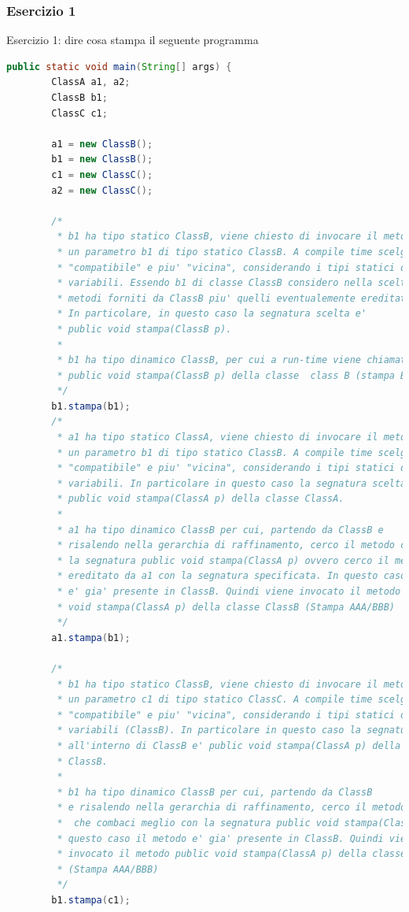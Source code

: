 \documentclass{article}
\begin{document}
\subsubsection{Esercizio 1}
\begin{framed}
Esercizio 1: dire cosa stampa il seguente programma 
\end{framed}
\begin{lstlisting}[language=Java,escapechar=|]
public static void main(String[] args) {
		ClassA a1, a2;
		ClassB b1;
		ClassC c1;

		a1 = new ClassB();
		b1 = new ClassB();
		c1 = new ClassC();
		a2 = new ClassC();

		/*
		 * b1 ha tipo statico ClassB, viene chiesto di invocare il metodo stampa su
		 * un parametro b1 di tipo statico ClassB. A compile time scelgo la segnatura
		 * "compatibile" e piu' "vicina", considerando i tipi statici delle
		 * variabili. Essendo b1 di classe ClassB considero nella scelta tutti i 
		 * metodi forniti da ClassB piu' quelli eventualemente ereditati. 
		 * In particolare, in questo caso la segnatura scelta e'
		 * public void stampa(ClassB p).
		 * 
		 * b1 ha tipo dinamico ClassB, per cui a run-time viene chiamato il metodo
		 * public void stampa(ClassB p) della classe  class B (stampa BBB)
		 */
		b1.stampa(b1);
		/*
		 * a1 ha tipo statico ClassA, viene chiesto di invocare il metodo stampa su
		 * un parametro b1 di tipo statico ClassB. A compile time scelgo la segnatura
		 * "compatibile" e piu' "vicina", considerando i tipi statici delle
		 * variabili. In particolare in questo caso la segnatura scelta e'
		 * public void stampa(ClassA p) della classe ClassA.
		 * 
		 * a1 ha tipo dinamico ClassB per cui, partendo da ClassB e
		 * risalendo nella gerarchia di raffinamento, cerco il metodo che combaci con
		 * la segnatura public void stampa(ClassA p) ovvero cerco il metodo
		 * ereditato da a1 con la segnatura specificata. In questo caso il metodo
		 * e' gia' presente in ClassB. Quindi viene invocato il metodo public
		 * void stampa(ClassA p) della classe ClassB (Stampa AAA/BBB)
		 */
		a1.stampa(b1);

		/*
		 * b1 ha tipo statico ClassB, viene chiesto di invocare il metodo stampa su
		 * un parametro c1 di tipo statico ClassC. A compile time scelgo la segnatura
		 * "compatibile" e piu' "vicina", considerando i tipi statici delle
		 * variabili (ClassB). In particolare in questo caso la segnatura scelta
		 * all'interno di ClassB e' public void stampa(ClassA p) della classe
		 * ClassB.
		 * 
		 * b1 ha tipo dinamico ClassB per cui, partendo da ClassB
		 * e risalendo nella gerarchia di raffinamento, cerco il metodo ereditato
		 *  che combaci meglio con la segnatura public void stampa(ClassA p). In
		 * questo caso il metodo e' gia' presente in ClassB. Quindi viene
		 * invocato il metodo public void stampa(ClassA p) della classe ClassB
		 * (Stampa AAA/BBB)
		 */
		b1.stampa(c1);


\end{lstlisting}
\end{document}

